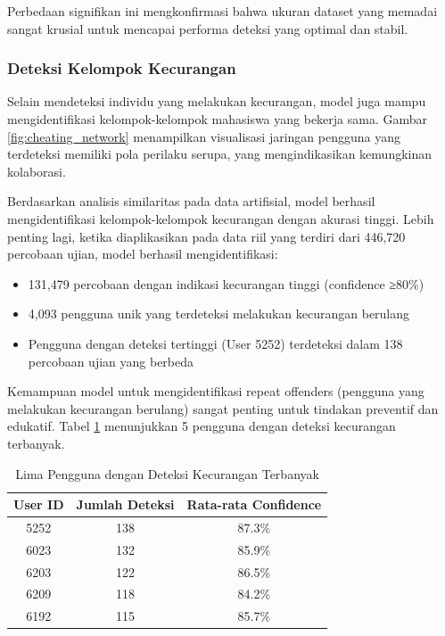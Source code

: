 Perbedaan signifikan ini mengkonfirmasi bahwa ukuran dataset yang memadai sangat krusial untuk mencapai performa deteksi yang optimal dan stabil.

\subsubsection{Deteksi Kelompok Kecurangan}

Selain mendeteksi individu yang melakukan kecurangan, model juga mampu mengidentifikasi kelompok-kelompok mahasiswa yang bekerja sama. Gambar \ref{fig:cheating_network} menampilkan visualisasi jaringan pengguna yang terdeteksi memiliki pola perilaku serupa, yang mengindikasikan kemungkinan kolaborasi.


Berdasarkan analisis similaritas pada data artifisial, model berhasil mengidentifikasi kelompok-kelompok kecurangan dengan akurasi tinggi. Lebih penting lagi, ketika diaplikasikan pada data riil yang terdiri dari 446,720 percobaan ujian, model berhasil mengidentifikasi:

\begin{itemize}
    \item 131,479 percobaan dengan indikasi kecurangan tinggi (confidence ≥80\%)
    \item 4,093 pengguna unik yang terdeteksi melakukan kecurangan berulang
    \item Pengguna dengan deteksi tertinggi (User 5252) terdeteksi dalam 138 percobaan ujian yang berbeda
\end{itemize}

Kemampuan model untuk mengidentifikasi repeat offenders (pengguna yang melakukan kecurangan berulang) sangat penting untuk tindakan preventif dan edukatif. Tabel \ref{tabel:topOffenders} menunjukkan 5 pengguna dengan deteksi kecurangan terbanyak.

\begin{table}[htbp]
\centering
\caption{Lima Pengguna dengan Deteksi Kecurangan Terbanyak}
\label{tabel:topOffenders}
\begin{tabular}{|c|c|c|}
\hline
\textbf{User ID} & \textbf{Jumlah Deteksi} & \textbf{Rata-rata Confidence} \\
\hline
5252 & 138 & 87.3\% \\
\hline
6023 & 132 & 85.9\% \\
\hline
6203 & 122 & 86.5\% \\
\hline
6209 & 118 & 84.2\% \\
\hline
6192 & 115 & 85.7\% \\
\hline
\end{tabular}
\end{table}

